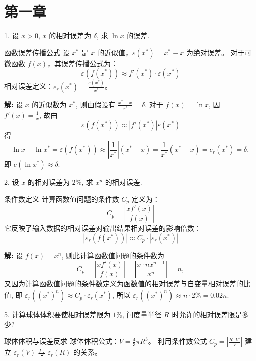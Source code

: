 \documentclass[a4paper,11pt]{ctexart}
\begin{document}
\tableofcontents
\newpage

\section{第一章}

1. 设 $x>0$, $x$ 的相对误差为 $\delta$, 求 $\ln x$ 的误差.

\begin{theorybox}{函数误差传播公式}
设 $x^*$ 是 $x$ 的近似值，$\varepsilon(x^*) = x^* - x$ 为绝对误差。
对于可微函数 $f(x)$，其误差传播公式为：
\[ \varepsilon(f(x^*)) \approx f'(x^*) \cdot \varepsilon(x^*) \]
相对误差定义：$e_r(x^*) = \frac{\varepsilon(x^*)}{x^*}$。
\end{theorybox}

\textbf{解: } 设 $x$ 的近似数为 $x^*$, 则由假设有 $\frac{x^*-x}{x^*} = \delta$. 对于 $f(x) = \ln x$, 因 $f'(x) = \frac{1}{x}$, 故由
\[
\varepsilon(f(x^*)) \approx |f'(x^*)| \varepsilon(x^*)
\]
得
\[
\ln x - \ln x^* = \varepsilon(f(x^*)) \approx \left| \frac{1}{x^*} \right| (x^* - x) = \frac{1}{x^*} (x^* - x) = e_r(x^*) = \delta,
\]
即 $e(\ln x^*) \approx \delta$.

\vspace{2em}

2. 设 $x$ 的相对误差为 $2\%$, 求 $x^n$ 的相对误差.

\begin{theorybox}{条件数定义}
计算函数值问题的条件数 $C_p$ 定义为：
\[ C_p = \left| \frac{x f'(x)}{f(x)} \right| \]
它反映了输入数据的相对误差对输出结果相对误差的影响倍数：
\[ |\varepsilon_r(f(x^*))| \approx C_p \cdot |\varepsilon_r(x^*)| \]
\end{theorybox}

\textbf{解: } 设 $f(x) = x^n$, 则此计算函数值问题的条件数为
\[
C_p = \left| \frac{x f'(x)}{f(x)} \right| = \left| \frac{x \cdot n x^{n-1}}{x^n} \right| = n,
\]
又因为计算函数值问题的条件数定义为函数值的相对误差与自变量相对误差的比值, 即 $\varepsilon_r((x^*)^n) \approx C_p \cdot \varepsilon_r(x^*)$, 所以 $\varepsilon_r((x^*)^n) \approx n \cdot 2\% = 0.02n$.

\vspace{2em}

5. 计算球体体积要使相对误差限为 $1\%$, 问度量半径 $R$ 时允许的相对误差限是多少?

\begin{theorybox}{球体体积与误差反求}
球体体积公式：$V = \frac{4}{3}\pi R^3$。
利用条件数公式 $C_p = \left| \frac{R \cdot V'}{V} \right|$ 建立 $\varepsilon_r(V)$ 与 $\varepsilon_r(R)$ 的关系。
\end{theorybox}
\end{document}

